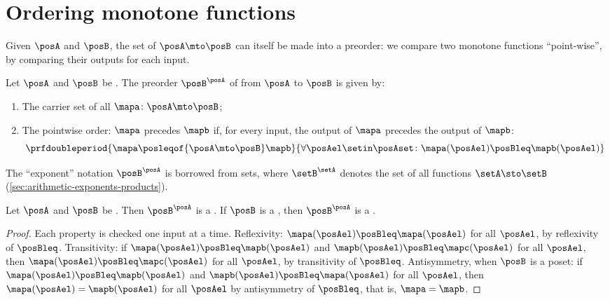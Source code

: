 

\section{Ordering monotone functions}
\label{sec:ordering-monotone-functions}

Given  $\posA$ and $\posB$, the set of  $\posA \mto \posB$ can itself be made into a preorder: we compare two monotone functions ``point-wise'', by comparing their outputs for each input.

\begin{ctdefinition}
    \label{def:order-monotone-maps}
    Let $\posA$ and $\posB$ be .
    The preorder $\posB^{\posA}$ of  from $\posA$ to $\posB$ is given by:

    \constit
    \begin{enumerate}
        \item The carrier set of all  $\mapa \colon \posA \mto \posB$;
        \item The pointwise order: $\mapa$ precedes $\mapb$ if, for every input, the output of $\mapa$ precedes the output of $\mapb$:
              \begin{equation}
                  \prfdoubleperiod{
                      \mapa \posleqof{\posA \mto \posB} \mapb
                  }{
                      \forall \posAel \setin \posAset \colon \mapa(\posAel) \posBleq \mapb(\posAel)
                  }
              \end{equation}
    \end{enumerate}
\end{ctdefinition}

The ``exponent'' notation $\posB^{\posA}$ is borrowed from sets, where $\setB^{\setA}$ denotes the set of all functions $\setA \sto \setB$ (\cref{sec:arithmetic-exponents-products}).

\begin{lemma}
    \label{lem:order-monotone-maps-preorder}
    Let $\posA$ and $\posB$ be .
    Then $\posB^{\posA}$ is a .
    If $\posB$ is a , then $\posB^{\posA}$ is a .
\end{lemma}
\begin{proof}
    Each property is checked one input at a time.
    Reflexivity: $\mapa(\posAel) \posBleq \mapa(\posAel)$ for all $\posAel$, by reflexivity of $\posBleq$.
    Transitivity: if $\mapa(\posAel) \posBleq \mapb(\posAel)$ and $\mapb(\posAel) \posBleq \mapc(\posAel)$ for all $\posAel$, then $\mapa(\posAel) \posBleq \mapc(\posAel)$ for all $\posAel$, by transitivity of $\posBleq$.
    Antisymmetry, when $\posB$ is a poset: if $\mapa(\posAel) \posBleq \mapb(\posAel)$ and $\mapb(\posAel) \posBleq \mapa(\posAel)$ for all $\posAel$, then $\mapa(\posAel) = \mapb(\posAel)$ for all $\posAel$ by antisymmetry of $\posBleq$, that is, $\mapa = \mapb$.
\end{proof}

